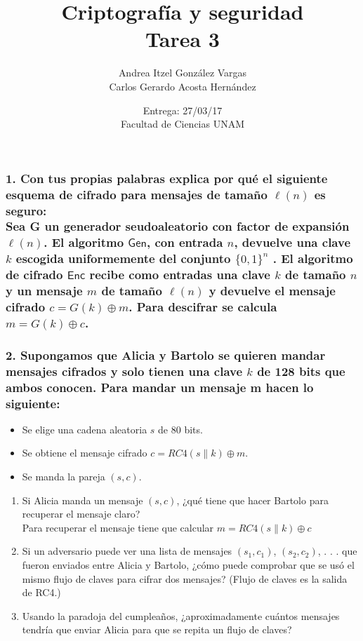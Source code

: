 \documentclass[12pt]{article}
\title{Criptografía y seguridad \\ Tarea 3}
\author{Andrea Itzel González Vargas \\ Carlos Gerardo Acosta Hernández}
\date{Entrega: 27/03/17 \\ Facultad de Ciencias UNAM}
\begin{document}
\maketitle
\subsubsection*{1. Con tus propias palabras explica por qué el siguiente esquema de cifrado para mensajes de tamaño $\ell(n)$ es seguro: \\
Sea G un generador seudoaleatorio con factor de expansión $\ell (n)$. El algoritmo $\textsf{Gen}$, con entrada $n$, devuelve una clave $k$ escogida uniformemente del conjunto $\{0, 1\}^n$ . El algoritmo de cifrado $\textsf{Enc}$ recibe como entradas una clave $k$ de tamaño $n$ y un mensaje $m$ de tamaño $\ell (n)$ y devuelve el mensaje cifrado $c = G(k) \oplus m$. Para descifrar se calcula $m = G(k) \oplus c$.}


\subsubsection*{2. Supongamos que Alicia y Bartolo se quieren mandar mensajes cifrados y solo tienen una clave $k$ de 128 bits que ambos conocen. Para mandar un mensaje m hacen lo siguiente:}
\begin{itemize}
\item Se elige una cadena aleatoria $s$ de 80 bits.
\item Se obtiene el mensaje cifrado $c = RC4(s \parallel k) \oplus m$.
\item Se manda la pareja $(s, c)$.
\end{itemize}
\begin{enumerate}[label=\alph*)]
\item Si Alicia manda un mensaje $(s, c)$, ¿qué tiene que hacer Bartolo para recuperar el mensaje claro? \\
Para recuperar el mensaje tiene que calcular $m = RC4(s \parallel k) \oplus c$
  
\item Si un adversario puede ver una lista de mensajes $(s_1, c_1)$, $(s_2, c_2)$, . . . que fueron enviados entre Alicia y Bartolo, ¿cómo puede comprobar que se usó el mismo flujo de claves para cifrar dos mensajes? (Flujo de claves es la salida de RC4.) \\
\item Usando la paradoja del cumpleaños, ¿aproximadamente cuántos mensajes tendría que enviar Alicia para que se repita un flujo de claves? \\
\end{enumerate}
\end{document}
